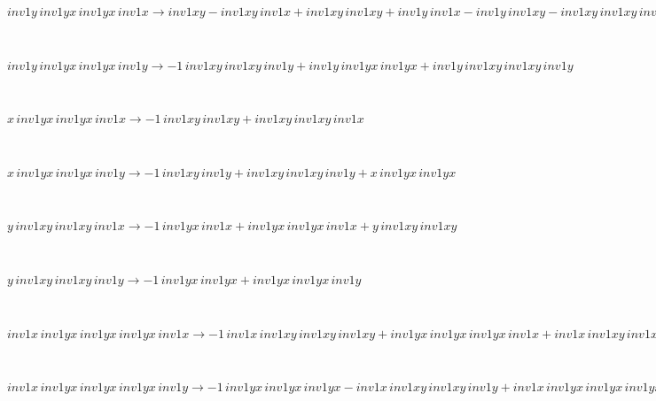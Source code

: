 \begin{minipage}{6in}
$
inv1y\,
 inv1yx\,
 inv1yx\,
 inv1x\rightarrow inv1xy - inv1xy\,
 inv1x + inv1xy\,
 inv1xy + inv1y\,
 inv1x - inv1y\,
 inv1xy - inv1xy\,
 inv1xy\,
 inv1x + inv1y\,
 inv1xy\,
 inv1x - inv1y\,
 inv1xy\,
 inv1xy + inv1y\,
 inv1xy\,
 inv1xy\,
 inv1x
$
\end{minipage}\medskip \\
\begin{minipage}{6in}
$
inv1y\,
 inv1yx\,
 inv1yx\,
 inv1y\rightarrow -1\,
 inv1xy\,
 inv1xy\,
 inv1y + inv1y\,
 inv1yx\,
 inv1yx + inv1y\,
 inv1xy\,
 inv1xy\,
 inv1y
$
\end{minipage}\medskip \\
\begin{minipage}{6in}
$
x\,
 inv1yx\,
 inv1yx\,
 inv1x\rightarrow -1\,
 inv1xy\,
 inv1xy + inv1xy\,
 inv1xy\,
 inv1x
$
\end{minipage}\medskip \\
\begin{minipage}{6in}
$
x\,
 inv1yx\,
 inv1yx\,
 inv1y\rightarrow -1\,
 inv1xy\,
 inv1y + inv1xy\,
 inv1xy\,
 inv1y + x\,
 inv1yx\,
 inv1yx
$
\end{minipage}\medskip \\
\begin{minipage}{6in}
$
y\,
 inv1xy\,
 inv1xy\,
 inv1x\rightarrow -1\,
 inv1yx\,
 inv1x + inv1yx\,
 inv1yx\,
 inv1x + y\,
 inv1xy\,
 inv1xy
$
\end{minipage}\medskip \\
\begin{minipage}{6in}
$
y\,
 inv1xy\,
 inv1xy\,
 inv1y\rightarrow -1\,
 inv1yx\,
 inv1yx + inv1yx\,
 inv1yx\,
 inv1y
$
\end{minipage}\medskip \\
\begin{minipage}{6in}
$
inv1x\,
 inv1yx\,
 inv1yx\,
 inv1yx\,
 inv1x\rightarrow -1\,
 inv1x\,
 inv1xy\,
 inv1xy\,
 inv1xy + inv1yx\,
 inv1yx\,
 inv1yx\,
 inv1x + inv1x\,
 inv1xy\,
 inv1xy\,
 inv1xy\,
 inv1x
$
\end{minipage}\medskip \\
\begin{minipage}{6in}
$
inv1x\,
 inv1yx\,
 inv1yx\,
 inv1yx\,
 inv1y\rightarrow -1\,
 inv1yx\,
 inv1yx\,
 inv1yx - inv1x\,
 inv1xy\,
 inv1xy\,
 inv1y + inv1x\,
 inv1yx\,
 inv1yx\,
 inv1yx + inv1yx\,
 inv1yx\,
 inv1yx\,
 inv1y + inv1x\,
 inv1xy\,
 inv1xy\,
 inv1xy\,
 inv1y
$
\end{minipage}\medskip \\

